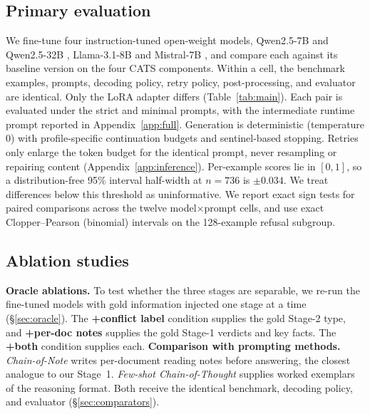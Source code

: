 \subsection{Primary evaluation}

We fine-tune four instruction-tuned open-weight models, Qwen2.5-7B and
Qwen2.5-32B \citep{yang2024qwen25}, Llama-3.1-8B \citep{dubey2024llama3} and
Mistral-7B \citep{jiang2023mistral7b}, and compare each against its baseline
version on the four CATS components. Within a cell, the benchmark examples,
prompts, decoding policy, retry policy, post-processing, and evaluator are
identical. Only the LoRA adapter differs (Table~\ref{tab:main}). Each pair is
evaluated under the strict and minimal prompts, with the intermediate runtime
prompt reported in Appendix~\ref{app:full}. Generation is deterministic
(temperature $0$) with profile-specific continuation budgets and
sentinel-based stopping. Retries only enlarge the token budget for the
identical prompt, never resampling or repairing content
(Appendix~\ref{app:inference}). Per-example scores lie in $[0,1]$, so a
distribution-free 95\% interval half-width at $n=736$ is $\pm0.034$. We treat
differences below this threshold as uninformative. We report exact sign
tests for paired comparisons across the twelve model$\times$prompt cells, and
use exact Clopper--Pearson (binomial) intervals on the 128-example refusal
subgroup.

\subsection{Ablation studies}

\textbf{Oracle ablations.} To test whether the three stages are separable, we
re-run the fine-tuned models with gold information injected one stage at a
time (\S\ref{sec:oracle}). The \textbf{+conflict label} condition supplies the
gold Stage-2 type, and \textbf{+per-doc notes} supplies the gold Stage-1
verdicts and key facts. The \textbf{+both} condition supplies each.
\textbf{Comparison with prompting methods.} \emph{Chain-of-Note}
\citep{yu2024chainofnote} writes per-document reading notes before answering,
the closest analogue to our Stage~1. \emph{Few-shot Chain-of-Thought}
\citep{wei2022cot} supplies worked exemplars of the reasoning format. Both
receive the identical benchmark, decoding policy, and evaluator
(\S\ref{sec:comparators}).
